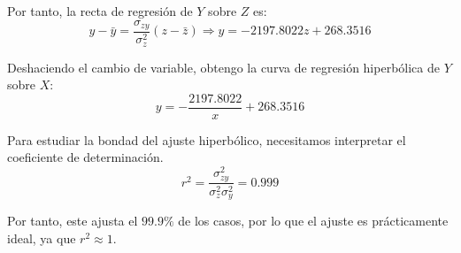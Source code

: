 \begin{ejercicio}
    Por tanto, la recta de regresión de $Y$ sobre $Z$ es:
    \begin{equation*}
        y-\bar{y} = \frac{\sigma_{zy}}{\sigma_z^2}(z-\bar{z}) \Longrightarrow y = -2197.8022z+268.3516
    \end{equation*}

    Deshaciendo el cambio de variable, obtengo la curva de regresión hiperbólica de $Y$ sobre $X$:
    \begin{equation*}
        y = -\frac{2197.8022}{x}+268.3516
    \end{equation*}

    Para estudiar la bondad del ajuste hiperbólico, necesitamos interpretar el coeficiente de determinación.
    \begin{equation*}
        r^2 = \frac{\sigma_{zy}^2}{\sigma_z^2 \sigma_y^2} = 0.999
    \end{equation*}

    Por tanto, este ajusta el $99.9\%$ de los casos, por lo que el ajuste es prácticamente ideal, ya que $r^2\approx 1$.
\end{ejercicio}

